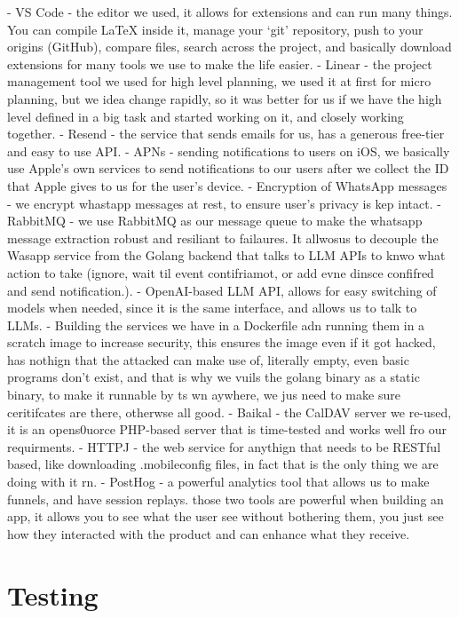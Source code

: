 - VS Code - the editor we used, it allows for extensions and can run many things. You can compile LaTeX inside it, manage your `git' repository, push to your origins (GitHub), compare files, search across the project, and basically download extensions for many tools we use to make the life easier.
- Linear - the project management tool we used for high level planning, we used it at first for micro planning, but we idea change rapidly, so it was better for us if we have the high level defined in a big task and started working on it, and closely working together.
- Resend - the service that sends emails for us, has a generous free-tier and easy to use API.
- APNs - sending notifications to users on iOS, we basically use Apple's own services to send notifications to our users after we collect the ID that Apple gives to us for the user's device.
- Encryption of WhatsApp messages - we encrypt whastapp messages at rest, to ensure user's privacy is kep intact.
- RabbitMQ - we use RabbitMQ as our message queue to make the whatsapp message extraction robust and resiliant to failaures. It allwosus to decouple the Wasapp service from the Golang backend that talks to LLM APIs to knwo what action to take (ignore, wait til event contifriamot, or add evne dinsce confifred and send notification.).
- OpenAI-based LLM API, allows for easy switching of models when needed, since it is the same interface, and allows us to talk to LLMs.
- Building the services we have in a Dockerfile adn running them in a scratch image to increase security, this ensures the image even if it got hacked, has nothign that the attacked can make use of, literally empty, even basic programs don't exist, and that is why we vuils the golang binary as a static binary, to make it runnable by ts wn aywhere, we jus need to make sure ceritifcates are there, otherwse all good.
- Baikal - the CalDAV server we re-used, it is an opens0uorce PHP-based server that is time-tested and works well fro our requirments.
- HTTPJ - the web service for anythign that needs to be RESTful based, like downloading .mobileconfig files, in fact that is the only thing we are doing with it rn.
- PostHog - a powerful analytics tool that allows us to make funnels, and have session replays. those two tools are powerful when building an app, it allows you to see what the user see without bothering them, you just see how they interacted with the product and can enhance what they receive.

\section{Testing}

